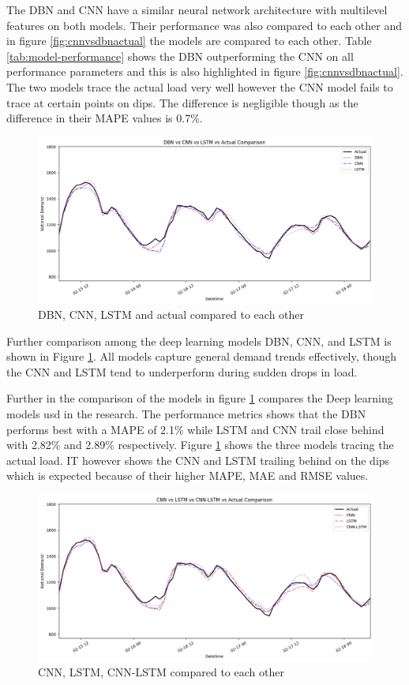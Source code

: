  The DBN and CNN have a similar neural network architecture with multilevel features on both models. Their performance was also compared to each other and in figure \ref{fig:cnnvsdbnactual} the models are compared to each other. Table \ref{tab:model-performance} shows the DBN outperforming the CNN on all performance parameters and this is also highlighted in figure \ref{fig:cnnvsdbnactual}. The two models trace the actual load very well however the CNN model fails to trace at certain points on dips. The difference is negligible though as the difference in their MAPE values is 0.7\%.
 \begin{figure}[h!]
 	\centering
 	\includegraphics[width=0.75\linewidth]{Chapters/images/results/cnn_vs_dbn_vs_lstm_vs_actual}
 	\caption{DBN, CNN, LSTM and actual compared to each other}
 	\label{fig:cnnvsdbnvslstmvsactual}
 \end{figure}
 
 Further comparison among the deep learning models DBN, CNN, and LSTM is shown in Figure \ref{fig:cnnvsdbnvslstmvsactual}. All models capture general demand trends effectively, though the CNN and LSTM tend to underperform during sudden drops in load.
 
 Further in the comparison of the models in figure \ref{fig:cnnvsdbnvslstmvsactual} compares the Deep learning models usd in the research. The performance metrics shows that the DBN performs best with a MAPE of 2.1\% while LSTM and CNN trail close behind with 2.82\% and 2.89\% respectively. Figure \ref{fig:cnnvsdbnvslstmvsactual} shows the three models tracing the actual load. IT however shows the CNN and LSTM trailing behind on the dips which is expected because of their higher MAPE, MAE and RMSE values.
  \begin{figure}[h!]
 	\centering
 	\includegraphics[width=0.75\linewidth]{Chapters/images/results/cnn_vs_lstm_vs_cnn-lstm_vs_actual}
 	\caption{CNN, LSTM, CNN-LSTM compared to each other}
 	\label{fig:cnnvslstmvscnn-lstmvsactual}
 \end{figure}
 

